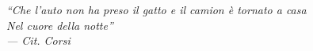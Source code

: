 
\thispagestyle{plain}

\vspace*{0.2\textheight}

\begin{flushright}
\slshape
``Che l'auto non ha preso il gatto e il camion \`e tornato a casa\\
Nel cuore della notte''\\
\medskip
--- Cit. Corsi
\end{flushright}
